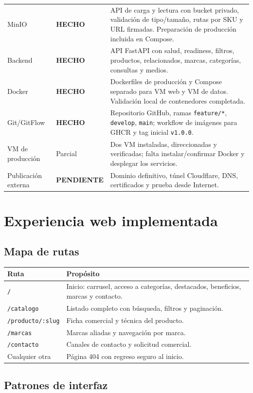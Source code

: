 \documentclass[11pt,a4paper]{article}
\newcommand{\ok}{\textcolor{done}{\textbf{HECHO}}}
\newcommand{\pending}{\textcolor{warning}{\textbf{PENDIENTE}}}
\newcommand{\code}[1]{\nolinkurl{#1}}
\begin{document}
\begin{longtable}{L{2.8cm}L{4.2cm}L{8.0cm}}
MinIO & \ok & API de carga y lectura con bucket privado, validación de tipo/tamaño, rutas por SKU y URL firmadas. Preparación de producción incluida en Compose.\\
Backend & \ok & API FastAPI con salud, readiness, filtros, productos, relacionados, marcas, categorías, consultas y medios.\\
Docker & \ok & Dockerfiles de producción y Compose separado para VM web y VM de datos. Validación local de contenedores completada.\\
Git/GitFlow & \ok & Repositorio GitHub, ramas \code{feature/*}, \code{develop}, \code{main}; workflow de imágenes para GHCR y tag inicial \code{v1.0.0}.\\
VM de producción & Parcial & Dos VM instaladas, direccionadas y verificadas; falta instalar/confirmar Docker y desplegar los servicios.\\
Publicación externa & \pending & Dominio definitivo, túnel Cloudflare, DNS, certificados y prueba desde Internet.\\
\bottomrule
\end{longtable}

\section{Experiencia web implementada}

\subsection{Mapa de rutas}

\begin{tabularx}{\textwidth}{L{3.6cm}Y}
\toprule
\textbf{Ruta} & \textbf{Propósito}\\
\midrule
\code{/} & Inicio: carrusel, acceso a categorías, destacados, beneficios, marcas y contacto.\\
\code{/catalogo} & Listado completo con búsqueda, filtros y paginación.\\
\code{/producto/:slug} & Ficha comercial y técnica del producto.\\
\code{/marcas} & Marcas aliadas y navegación por marca.\\
\code{/contacto} & Canales de contacto y solicitud comercial.\\
Cualquier otra & Página 404 con regreso seguro al inicio.\\
\bottomrule
\end{tabularx}

\subsection{Patrones de interfaz}
\end{document}
